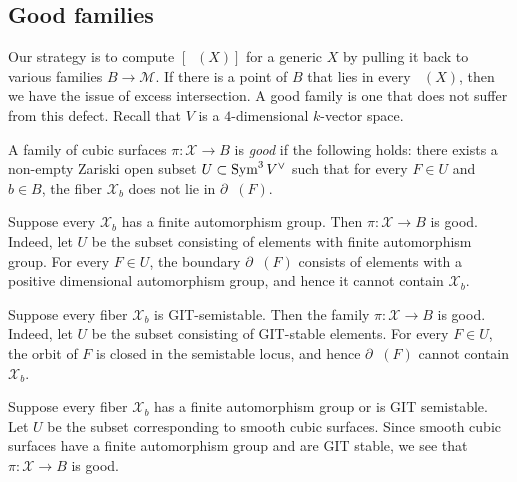 \documentclass[11pt,reqno, letterpaper]{amsart}
\renewcommand{\k}{k}
\DeclareMathOperator{\Orb}{\overline{Orb}}
\renewcommand{\to}{{\longrightarrow}}
\numberwithin{equation}{section}
\newcommand{\cX}{\mathcal{X}}
\begin{document}
\subsection{Good families}
\label{sec:good-families}
Our strategy is to compute $[\Orb(X)]$ for a generic $X$ by pulling it back to various families $B \to \mathscr M$.
If there is a point of $B$ that lies in every $\Orb(X)$, then we have the issue of excess intersection. 
A good family is one that does not suffer from this defect.
Recall that $V$ is a $4$-dimensional $\k$-vector space.
\begin{definition}
\label{def:goodfamily}
A family of cubic surfaces $\pi \colon \cX \to B$ is \emph{good} if
the following holds: there exists a non-empty Zariski open subset
$U \subset \operatorname{Sym}^3V^\vee$ such that for every $F \in U$ and $b \in B$,
the fiber $\cX_b$ does not lie in $\partial \Orb(F)$.
\end{definition}
\begin{example}
  \label{ex:finaut}
  Suppose every $\cX_b$ has a finite automorphism group.  Then
  $\pi \colon \cX \to B$ is good.  Indeed, let $U$ be the subset
  consisting of elements with finite automorphism group.  For every
  $F \in U$, the boundary $\partial \Orb(F)$ consists of elements with
  a positive dimensional automorphism group, and hence it cannot
  contain $\cX_b$.
\end{example}
\begin{example}
  \label{ex:semistable}
  Suppose every fiber $\cX_b$ is GIT-semistable.
  Then the family $\pi \colon \cX \to B$ is good.
  Indeed, let $U$ be the subset consisting of GIT-stable elements.
  For every $F \in U$, the orbit of $F$ is closed in the semistable locus, and hence $\partial \Orb(F)$ cannot contain $\cX_b$.
\end{example}
\begin{example}[A combination]
  Suppose every fiber $\cX_b$ has a finite automorphism group or is GIT semistable.
  Let $U$ be the subset corresponding to smooth cubic surfaces.
  Since smooth cubic surfaces have a finite automorphism group and are GIT stable, we see that $\pi \colon \mathcal X \to B$ is good.
\end{example}
\end{document}
